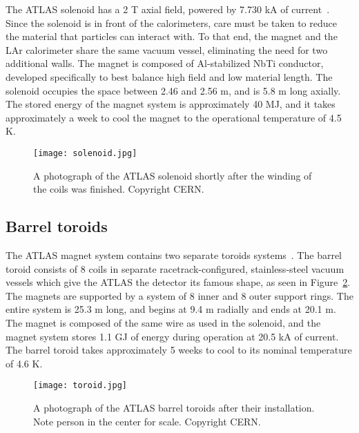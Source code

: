 The ATLAS solenoid has a 2 T axial field, powered by 7.730 kA of current~\cite{ATLASPaper}. Since the solenoid is in front of the calorimeters, care must be taken to reduce the material that particles can interact with. To that end, the magnet and the LAr calorimeter share the same vacuum vessel, eliminating the need for two additional walls. The magnet is composed of Al-stabilized NbTi conductor, developed specifically to best balance high field and low material length. The solenoid occupies the space between 2.46 and 2.56 m, and is 5.8 m long axially. The stored energy of the magnet system is approximately 40 MJ, and it takes approximately a week to cool the magnet to the operational temperature of 4.5 K. 


\begin{figure}
\centering
\texttt{[image: solenoid.jpg]}
\caption{A photograph of the ATLAS solenoid shortly after the winding of the coils was finished. Copyright CERN.}
\label{fig:detector:solenoid}
\end{figure}



\subsection{Barrel toroids}

The ATLAS magnet system contains two separate toroids systems~\cite{ATLASPaper,ATLASMS}. The barrel toroid consists of 8 coils in separate racetrack-configured, stainless-steel vacuum vessels which give the ATLAS the detector its famous shape, as seen in Figure~\ref{fig:detector:toroid}. The magnets are supported by a system of 8 inner and 8 outer support rings. The entire system is 25.3 m long, and begins at 9.4 m radially and ends at 20.1 m. The magnet is composed of the same wire as used in the solenoid, and the magnet system stores 1.1 GJ of energy during operation at 20.5 kA of current. The barrel toroid takes approximately 5 weeks to cool to its nominal temperature of 4.6 K.



\begin{figure}
\centering
\texttt{[image: toroid.jpg]}
\caption{A photograph of the ATLAS barrel toroids after their installation. Note person in the center for scale. Copyright CERN.}
\label{fig:detector:toroid}
\end{figure}

